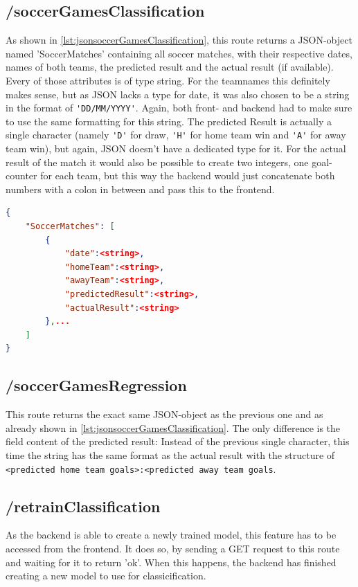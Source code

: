 \subsection{/soccerGamesClassification}
As shown in \ref{lst:jsonsoccerGamesClassification}, this route returns a JSON-object named 'SoccerMatches' containing all soccer matches, with their respective dates, names of both teams, the predicted result and the actual result (if available). Every of those attributes is of type string. For the teamnames this definitely makes sense, but as JSON lacks a type for date, it was also chosen to be a string in the format of \lstinline[columns=fixed]{'DD/MM/YYYY'}. Again, both front- and backend had to make sure to use the same formatting for this string. The predicted Result is actually a single character (namely \lstinline[columns=fixed]{'D'} for draw, \lstinline[columns=fixed]{'H'} for home team win and \lstinline[columns=fixed]{'A'} for away team win), but again, JSON doesn't have a dedicated type for it. For the actual result of the match it would also be possible to create two integers, one goal-counter for each team, but this way the backend would just concatenate both numbers with a colon in between and pass this to the frontend.

\begin{lstlisting}[language=JSON,label={lst:jsonsoccerGamesClassification}, caption=JSON structure of API call on /soccerGamesClassification]
{
    "SoccerMatches": [
        {
            "date":<string>,
            "homeTeam":<string>,
            "awayTeam":<string>,
            "predictedResult":<string>,
            "actualResult":<string>
        },...
    ]
}
\end{lstlisting}

\subsection{/soccerGamesRegression}
This route returns the exact same JSON-object as the previous one and as already shown in \ref{lst:jsonsoccerGamesClassification}. The only difference is the field content of the predicted result: Instead of the previous single character, this time the string has the same format as the actual result with the structure of \lstinline[columns=fixed]{<predicted home team goals>:<predicted away team goals}.

\subsection{/retrainClassification}
As the backend is able to create a newly trained model, this feature has to be accessed from the frontend. It does so, by sending a GET request to this route and waiting for it to return 'ok'. When this happens, the backend has finished creating a new model to use for classicification.

